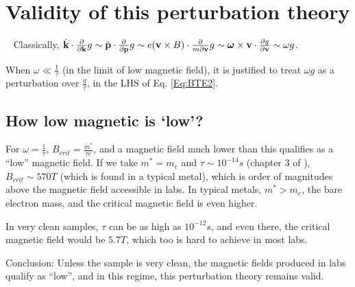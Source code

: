 \documentclass{revtex4-2}
\newcommand{\bvec}[1]{{\mathbf #1}}
\renewcommand\vec[1]{\ensuremath\boldsymbol{#1}} %
\begin{document}
\section{Validity of this perturbation theory}~\label{app:perturbation_validation}
Classically, $\dot{\bvec{k}}\cdot\frac{\partial}{\partial \bvec{k}} g \sim \dot{\bvec{p}}\cdot\frac{\partial}{\partial \bvec{p}} g \sim e (\bvec{v}\times{B})\cdot\frac{\partial}{m\partial \bvec{v}} g \sim \vec{\omega} \times \bvec{v}\cdot \frac{\partial g}{\partial \bvec{v}} \sim \omega g$.

When $\omega \ll \frac{1}{\tau}$ (in the limit of low magnetic field), it is justified to treat $\omega g$ as a perturbation over $\frac{g}{\tau}$, in the LHS of Eq. \eqref{Eq:BTE2}.
\subsection{How low magnetic is `low'?}
For $\omega = \frac{1}{\tau}$, $B_{crit} = \frac{m^*}{\tau e}$, and a magnetic field much lower than this qualifies as a ``low'' magnetic field. If we take $m^* = m_e$ and $\tau \sim 10^{-14} s$ (chapter 3 of \cite{book:SimonSolidState}), $B_{crit} \sim 570 T$ (which is found in a typical metal), which is order of magnitudes above the magnetic field accessible in labs. In typical metals, $m^* > m_e$, the bare electron mass, and the critical magnetic field is even higher.

In very clean samples, $\tau$ can be as high as $10^{-12} s$, and even there, the critical magnetic field would be  $5.7 T$, which too is hard to achieve in most labs.

Conclusion: Unless the sample is very clean, the magnetic fields produced in labs qualify as ``low'', and in this regime, this perturbation theory remains valid.


\end{document}
